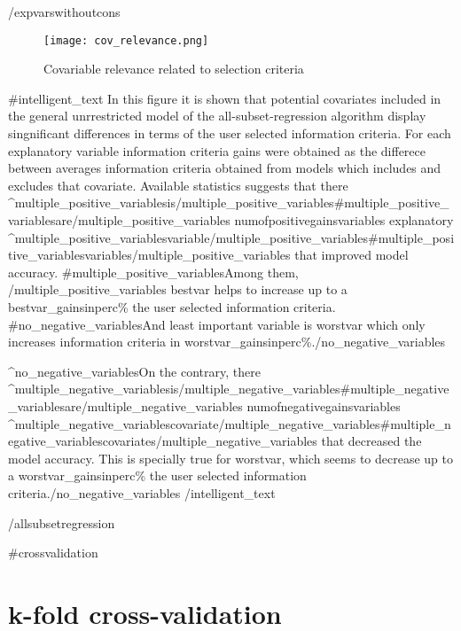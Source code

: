 \documentclass{article}
\begin{document}
\clearpage
{{/expvarswithoutcons}}

\begin{figure}[!ht]
    \centering
    \caption{Covariable relevance related to selection criteria}
    \texttt{[image: cov\_relevance.png]}
\end{figure}

{{#intelligent_text}}
In this figure it is shown that potential covariates included in the general unrrestricted model of the all-subset-regression algorithm display singnificant differences in terms of the user selected information criteria. For each explanatory variable information criteria gains were obtained as the differece between averages information criteria obtained from models which includes and excludes that covariate. Available statistics suggests that there {{^multiple_positive_variables}}is{{/multiple_positive_variables}}{{#multiple_positive_variables}}are{{/multiple_positive_variables}} {{numofpositivegainsvariables}} explanatory {{^multiple_positive_variables}}variable{{/multiple_positive_variables}}{{#multiple_positive_variables}}variables{{/multiple_positive_variables}} that improved model accuracy. {{#multiple_positive_variables}}Among them, {{/multiple_positive_variables}} {{ bestvar }} helps to increase up to a {{bestvar_gainsinperc}}\% the user selected information criteria. {{#no_negative_variables}}And least important variable is {{ worstvar }} which only increases information criteria in {{worstvar_gainsinperc}}\%.{{/no_negative_variables}}

{{^no_negative_variables}}On the contrary, there {{^multiple_negative_variables}}is{{/multiple_negative_variables}}{{#multiple_negative_variables}}are{{/multiple_negative_variables}} {{numofnegativegainsvariables}} {{^multiple_negative_variables}}covariate{{/multiple_negative_variables}}{{#multiple_negative_variables}}covariates{{/multiple_negative_variables}} that decreased the model accuracy. This is specially true for {{worstvar}}, which seems to decrease up to a {{worstvar_gainsinperc}}\% the user selected information criteria.{{/no_negative_variables}}
{{/intelligent_text}}

{{/allsubsetregression}}

{{#crossvalidation}}
\section{k-fold cross-validation}
\end{document}
